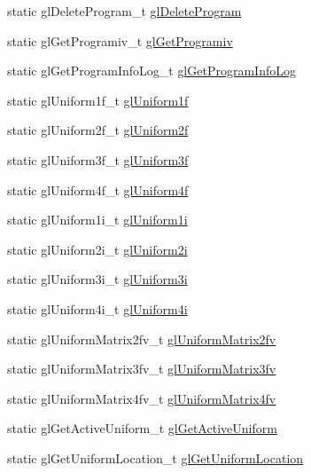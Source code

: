 \begin{DoxyCompactItemize}
\item 
static gl\+Delete\+Program\+\_\+t \hyperlink{namespacetrimesh_abe8fc73d863458a17fd4203bf277687c}{gl\+Delete\+Program}
\item 
static gl\+Get\+Programiv\+\_\+t \hyperlink{namespacetrimesh_a2eabc86d273e5c75453c47f6b31f0ca8}{gl\+Get\+Programiv}
\item 
static gl\+Get\+Program\+Info\+Log\+\_\+t \hyperlink{namespacetrimesh_a908a405092f51af5a8807950b4b6d61a}{gl\+Get\+Program\+Info\+Log}
\item 
static gl\+Uniform1f\+\_\+t \hyperlink{namespacetrimesh_a182bd4e8bcaba88023ceb95977d2ed44}{gl\+Uniform1f}
\item 
static gl\+Uniform2f\+\_\+t \hyperlink{namespacetrimesh_a0a9eb8da7d523099789721e24327e731}{gl\+Uniform2f}
\item 
static gl\+Uniform3f\+\_\+t \hyperlink{namespacetrimesh_a7d98d4d2574fd827bc72d265d3b1e763}{gl\+Uniform3f}
\item 
static gl\+Uniform4f\+\_\+t \hyperlink{namespacetrimesh_a1688c9b902ac92a746cc4644f7f25625}{gl\+Uniform4f}
\item 
static gl\+Uniform1i\+\_\+t \hyperlink{namespacetrimesh_a2081a848504d5f5ca94413d700c961e6}{gl\+Uniform1i}
\item 
static gl\+Uniform2i\+\_\+t \hyperlink{namespacetrimesh_a8d84db0c998702352beed5c71caa9601}{gl\+Uniform2i}
\item 
static gl\+Uniform3i\+\_\+t \hyperlink{namespacetrimesh_af0371770ec12030d984b88a74ab5f7bc}{gl\+Uniform3i}
\item 
static gl\+Uniform4i\+\_\+t \hyperlink{namespacetrimesh_abd25cffb3e0b247ec1ebd9c22f096af4}{gl\+Uniform4i}
\item 
static gl\+Uniform\+Matrix2fv\+\_\+t \hyperlink{namespacetrimesh_aae6a81d4bd65aee0d4d11779d347afc2}{gl\+Uniform\+Matrix2fv}
\item 
static gl\+Uniform\+Matrix3fv\+\_\+t \hyperlink{namespacetrimesh_a3f0fdb93ca33339f92c4bf8d7d53b15f}{gl\+Uniform\+Matrix3fv}
\item 
static gl\+Uniform\+Matrix4fv\+\_\+t \hyperlink{namespacetrimesh_a6c258d9116c5c1bf56e1e7e4f3deea77}{gl\+Uniform\+Matrix4fv}
\item 
static gl\+Get\+Active\+Uniform\+\_\+t \hyperlink{namespacetrimesh_ae8a6b5a15706b8ae605c71f68af69171}{gl\+Get\+Active\+Uniform}
\item 
static gl\+Get\+Uniform\+Location\+\_\+t \hyperlink{namespacetrimesh_a41397db4ab44658adc5410948848895a}{gl\+Get\+Uniform\+Location}

\end{DoxyCompactItemize}
